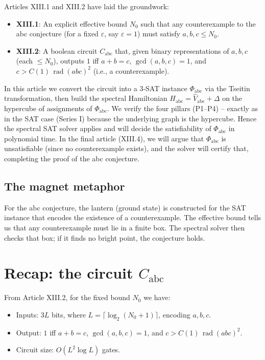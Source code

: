 \documentclass[11pt,a4paper]{article}
\begin{document}
Articles XIII.1 and XIII.2 have laid the groundwork:
\begin{itemize}
\item \textbf{XIII.1}: An explicit effective bound $N_0$ such that any counterexample to the abc conjecture (for a fixed $\varepsilon$, say $\varepsilon=1$) must satisfy $a,b,c \le N_0$.
\item \textbf{XIII.2}: A boolean circuit $C_{\text{abc}}$ that, given binary representations of $a,b,c$ (each $\le N_0$), outputs $1$ iff $a+b=c$, $\gcd(a,b,c)=1$, and $c > C(1)\,\operatorname{rad}(abc)^{2}$ (i.e., a counterexample).
\end{itemize}
In this article we convert the circuit into a 3‑SAT instance $\Phi_{\text{abc}}$ via the Tseitin transformation, then build the spectral Hamiltonian $H_{\text{abc}} = \hat{V}_{\text{abc}} + \Delta$ on the hypercube of assignments of $\Phi_{\text{abc}}$. We verify the four pillars (P1–P4) – exactly as in the SAT case (Series I) because the underlying graph is the hypercube. Hence the spectral SAT solver applies and will decide the satisfiability of $\Phi_{\text{abc}}$ in polynomial time. In the final article (XIII.4), we will argue that $\Phi_{\text{abc}}$ is unsatisfiable (since no counterexample exists), and the solver will certify that, completing the proof of the abc conjecture.

\subsection{The magnet metaphor}

For the abc conjecture, the lantern (ground state) is constructed for the SAT instance that encodes the existence of a counterexample. The effective bound tells us that any counterexample must lie in a finite box. The spectral solver then checks that box; if it finds no bright point, the conjecture holds.

\section{Recap: the circuit $C_{\text{abc}}$}

From Article XIII.2, for the fixed bound $N_0$ we have:
\begin{itemize}
\item Inputs: $3L$ bits, where $L = \lceil \log_2(N_0+1)\rceil$, encoding $a,b,c$.
\item Output: $1$ iff $a+b=c$, $\gcd(a,b,c)=1$, and $c > C(1)\,\operatorname{rad}(abc)^{2}$.
\item Circuit size: $O(L^2 \log L)$ gates.
\end{itemize}
\end{document}
